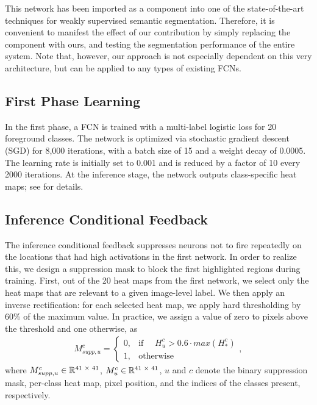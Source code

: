 \documentclass[10pt,twocolumn,letterpaper]{article}
\begin{document}
This network has been imported as a component into one of the state-of-the-art techniques for weakly supervised semantic segmentation. Therefore, it is convenient to manifest the effect of our contribution by simply replacing the component with ours, and testing the segmentation performance of the entire system. Note that, however, our approach is not especially dependent on this very architecture, but can be applied to any types of existing FCNs.

\subsection{First Phase Learning}
In the first phase, a FCN is trained with a multi-label logistic loss for 20 foreground classes. The network is optimized via stochastic gradient descent (SGD) for 8,000 iterations, with a batch size of 15 and a weight decay of 0.0005. The learning rate is initially set to 0.001 and is reduced by a factor of 10 every 2000 iterations. At the inference stage, the network outputs class-specific heat maps; see \cite{zhou2016cvpr} for details. 


\subsection{Inference Conditional Feedback}
The inference conditional feedback suppresses neurons not to fire repeatedly on the locations that had high activations in the first network. In order to realize this, we design a suppression mask to block the first highlighted regions during training. First, out of the 20 heat maps from the first network, we select only the heat maps that are relevant to a given image-level label. We then apply an inverse rectification: for each selected heat map, we apply hard thresholding by 60\% of the maximum value. In practice, we assign a value of zero to pixels above the threshold and one otherwise, as 
\begin{eqnarray}
   M_{supp,u}^{c} =  
\begin{cases}
    0,& \text{if }  \quad H_{u}^{c} > 0.6 \cdot max(H_{*}^{c})\\
    1,              & \text{otherwise}
\end{cases},
\label{eq:binary_sup_mask}
\end{eqnarray}
where $M_{supp,u}^{c} \in \mathbb{R} \textsuperscript{41 $\times$ 41}$,  $M_{u}^{c}\in \mathbb{R} \textsuperscript{41 $\times$ 41}$, $u$ and $c$ denote the binary suppression mask, per-class heat map, pixel position, and the indices of the classes present, respectively.
\end{document}
